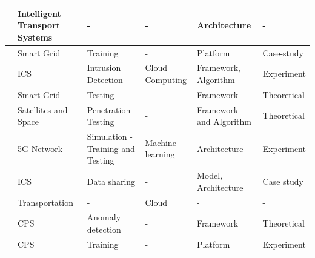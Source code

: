 \begin{longtable}{>{\small}p{0.5cm}p{2cm}p{2.9cm}p{3.0cm}p{3.0cm}p{2.0cm}}
    \cite{masiSecuringCriticalInfrastructures2023} & Intelligent Transport Systems & - & - & Architecture & - \\
    \hline

    \cite{kandasamyElectricPowerDigital2022} & Smart Grid & Training & - & Platform & Case-study \\
    \hline


    \cite{akbarianSecurityFrameworkDigital2021} & ICS & Intrusion Detection & Cloud Computing & Framework, Algorithm & Experiment \\
    \hline


    \cite{atalayDigitalTwinsApproach2020} & Smart Grid & Testing & - & Framework & Theoretical \\
    \hline

    \cite{houDigitalTwinRuntime2022} & Satellites and Space & Penetration Testing & - & Framework and Algorithm & Theoretical \\
    \hline


    \cite{rebecchiDigitalTwin5G2022} & 5G Network & Simulation - Training and Testing & Machine learning & Architecture & Experiment \\
    \hline

    \cite{gehrmannDigitalTwinBased2020} & ICS &  Data sharing & - & Model, Architecture & Case study \\
    \hline

    \cite{chengzhelaiSPDTSecurePrivacyPreserving2022} & Transportation & - & Cloud & - & - \\
    \hline

    \cite{alessandradebenedictischristiancarmineespositoalessandrasommaAdoptionSecureCyber2022} & CPS & Anomaly detection & - & Framework & Theoretical \\
    \hline
    
    \cite{vielberth2021digital} & CPS & Training & - & Platform & Experiment \\
    \hline


\end{longtable}
